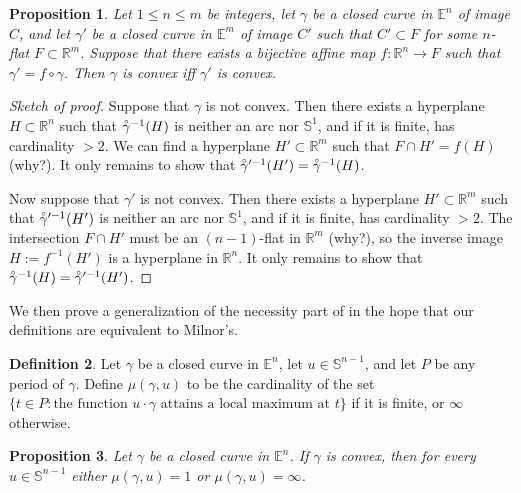 \documentclass{amsart}
\newtheorem{proposition}{Proposition}[section]
\theoremstyle{definition}
\newtheorem{definition}[proposition]{Definition}
\theoremstyle{remark}
\newcommand{\lring}[1]{\accentset{\circ}{#1}}
\begin{document}
\begin{proposition}
    \label{pro:convex_preserved}
    Let $1\le n\le m$ be integers, let $\gamma$ be a closed curve
    in $\mathbb{E}^n$ of image $C$, and let $\gamma'$ be a closed curve
    in $\mathbb{E}^m$ of image $C'$ such that $C'\subset F$
    for some $n$-flat $F\subset\mathbb{R}^m$.
    Suppose that there exists a bijective affine map
    $f:\mathbb{R}^n\to F$ such that $\gamma'=f\circ\gamma$.
    Then $\gamma$ is convex iff $\gamma'$ is convex.
\end{proposition}

\begin{proof}[Sketch of proof]
    Suppose that $\gamma$ is not convex.
    Then there exists a hyperplane $H\subset\mathbb{R}^n$
    such that $\lring{\gamma}^{-1}(H)$ is neither an arc
    nor $\mathbb{S}^1$, and if it is finite, has cardinality $>2$.
    We can find a hyperplane $H'\subset\mathbb{R}^m$ such that
    $F\cap H'=f(H)$ (why?). It only remains to show that
    $\lring{\gamma}'^{-1}(H')=\lring{\gamma}^{-1}(H)$.

    Now suppose that $\gamma'$ is not convex.
    Then there exists a hyperplane $H'\subset\mathbb{R}^m$
    such that $\lring{\gamma}'^{-1}(H')$ is neither an arc
    nor $\mathbb{S}^1$, and if it is finite, has cardinality $>2$.
    The intersection $F\cap H'$ must be an $(n-1)$-flat
    in $\mathbb{R}^m$ (why?), so the inverse image
    $H:=f^{-1}(H')$ is a hyperplane in $\mathbb{R}^n$.
    It only remains to show that
    $\lring{\gamma}^{-1}(H)=\lring{\gamma}'^{-1}(H')$.
\end{proof}

We then prove a generalization of the necessity part
of \cite[Lemma 3.3]{milnor} in the hope that
our definitions are equivalent to Milnor's.

\begin{definition}
    Let $\gamma$ be a closed curve in $\mathbb{E}^n$,
    let $u\in\mathbb{S}^{n-1}$,
    and let $P$ be any period of $\gamma$.
    Define $\mu(\gamma,u)$ to be the cardinality of the set
    $\{t\in P:\text{the function }u\cdot\gamma
        \text{ attains a local maximum at }t\}$
    if it is finite, or $\infty$ otherwise.
\end{definition}

\begin{proposition}
    Let $\gamma$ be a closed curve in $\mathbb{E}^n$.
    If $\gamma$ is convex, then for every $u\in\mathbb{S}^{n-1}$
    either $\mu(\gamma,u)=1$ or $\mu(\gamma,u)=\infty$.
\end{proposition}
\end{document}
